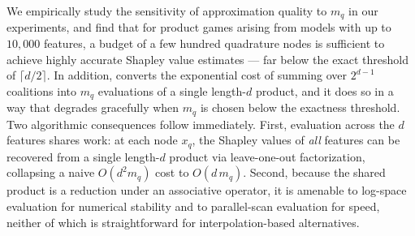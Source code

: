 \documentclass{article}
\begin{document}
We empirically study the sensitivity of approximation quality to $m_q$ in our experiments, and find that for product games arising from models with up to $10{,}000$ features, a budget of a few hundred quadrature nodes is sufficient to achieve highly accurate Shapley value estimates — far below the exact threshold of $\lceil d/2 \rceil$.
In addition,  converts the exponential cost of summing over $2^{d-1}$ coalitions into $m_q$ evaluations of a single length-$d$ product, and it does so in a way that degrades gracefully when $m_q$ is chosen below the exactness threshold. Two algorithmic consequences follow immediately. First, evaluation across the $d$ features shares work: at each node $x_q$, the Shapley values of \emph{all} features can be recovered from a single length-$d$ product via leave-one-out factorization, collapsing a naive $O(d^2 m_q)$ cost to $O(d\,m_q)$. Second, because the shared product is a reduction under an associative operator, it is amenable to log-space evaluation for numerical stability and to parallel-scan evaluation for speed, neither of which is straightforward for interpolation-based alternatives.





\end{document}
